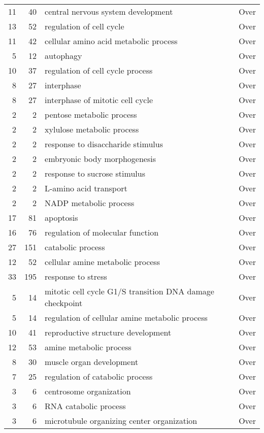 \documentclass[10pt]{bmc_article}
\newenvironment{bmcformat}{\begin{raggedright}\baselineskip20pt\sloppy\setboolean{publ}{false}}{\end{raggedright}\baselineskip20pt\sloppy}
\begin{document}
\begin{bmcformat}
\begin{longtable}{rrll}
   11 &  40 & central nervous system development & Over \\ 
   13 &  52 & regulation of cell cycle & Over \\ 
   11 &  42 & cellular amino acid metabolic process & Over \\ 
    5 &  12 & autophagy & Over \\ 
   10 &  37 & regulation of cell cycle process & Over \\ 
    8 &  27 & interphase & Over \\ 
    8 &  27 & interphase of mitotic cell cycle & Over \\ 
    2 &   2 & pentose metabolic process & Over \\ 
    2 &   2 & xylulose metabolic process & Over \\ 
    2 &   2 & response to disaccharide stimulus & Over \\ 
    2 &   2 & embryonic body morphogenesis & Over \\ 
    2 &   2 & response to sucrose stimulus & Over \\ 
    2 &   2 & L-amino acid transport & Over \\ 
    2 &   2 & NADP metabolic process & Over \\ 
   17 &  81 & apoptosis & Over \\ 
   16 &  76 & regulation of molecular function & Over \\ 
   27 & 151 & catabolic process & Over \\ 
   12 &  52 & cellular amine metabolic process & Over \\ 
   33 & 195 & response to stress & Over \\ 
    5 &  14 & mitotic cell cycle G1/S transition DNA damage checkpoint & Over \\ 
    5 &  14 & regulation of cellular amine metabolic process & Over \\ 
   10 &  41 & reproductive structure development & Over \\ 
   12 &  53 & amine metabolic process & Over \\ 
    8 &  30 & muscle organ development & Over \\ 
    7 &  25 & regulation of catabolic process & Over \\ 
    3 &   6 & centrosome organization & Over \\ 
    3 &   6 & RNA catabolic process & Over \\ 
    3 &   6 & microtubule organizing center organization & Over \\ 

\end{longtable}
\end{bmcformat}
\end{document}
